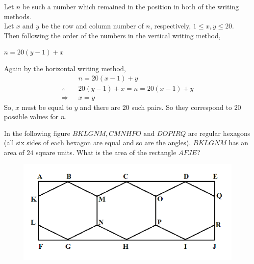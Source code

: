 \documentclass{subfile}
\begin{document}
	\begin{solution} Let $n$ be such a number which remained in the position in both of the writing methods.\\
		Let $x$ and $y$ be the row and column number of $n$, respectively, $1\leq x,y \leq 20$.\\
		Then following the order of the numbers in the vertical writing method,
		\begin{center}
			$n=20(y-1)+x$\\
		\end{center}


		\begin{flushleft}
			Again by the horizontal writing method,
			\begin{align*}
			&n=20(x-1)+y\\
			\therefore \text{ } &20(y-1)+x=n=20(x-1)+y\\
			\Rightarrow \text{ } &x=y
			\end{align*}
			So, $x$ must be equal to $y$ and there are $20$ such pairs. So they correspond to $20$ possible values for $n$.
		\end{flushleft}

	\end{solution}

	\begin{problem} In the following figure $BKLGNM, CMNHPO \text{ and } DOPIRQ$ are regular hexagons (all six sides of
		each hexagon are equal and so are the angles). $BKLGNM$ has an area of $24$ square units. What is the
		area of the rectangle $AFJE$?
		\begin{figure}[h]
			\centering
			\includegraphics[width=0.7\linewidth]{Prob60.png}
		\end{figure}
	\end{problem}
\end{document}
